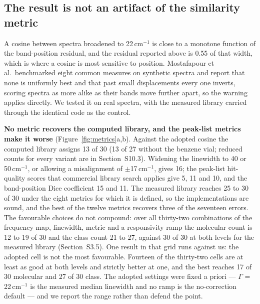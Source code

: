 \documentclass[review,12pt]{elsarticle}
\newcommand*\wn{\ensuremath{\text{cm}^{-1}}}
\begin{document}
\subsection{The result is not an artifact of the similarity metric}

A cosine between spectra broadened to 22\,\wn{} is close to a monotone function of the
band-position residual, and the residual reported above is 0.55 of that width, which is
where a cosine is most sensitive to position. Mostafapour et al.\ benchmarked eight common
measures on synthetic spectra and report that none is uniformly best and that past small
displacements every one inverts, scoring spectra as more alike as their bands move further
apart,\cite{mostafapour2026raman} so the warning applies directly. We tested it on real
spectra, with the measured library carried through the identical code as the control.

\textbf{No metric recovers the computed library, and the peak-list metrics make it worse}
(Figure~\ref{fig:metrics}a,b). Against the adopted cosine the computed library assigns 13
of 30 (13 of 27 without the benzene vial; reduced counts for every variant are in
Section~S10.3). Widening the linewidth to 40 or 50\,\wn{}, or allowing a misalignment of
$\pm$17\,\wn{}, gives 16; the peak-list hit-quality scores that commercial library search
applies give 5, 11 and 10, and the band-position Dice coefficient 15 and 11. The measured
library reaches 25 to 30 of 30 under the eight metrics for which it is defined, so the
implementations are sound, and the best of the twelve metrics recovers three of the
seventeen errors. The favourable choices do not compound: over all thirty-two combinations
of the frequency map, linewidth, metric and a responsivity ramp the molecular count is 12
to 19 of 30 and the class count 21 to 27, against 30 of 30 at both levels for the measured
library (Section~S3.5). One result in that grid runs against us: the adopted cell is not
the most favourable. Fourteen of the thirty-two cells are at least as good at both levels
and strictly better at one, and the best reaches 17 of 30 molecular and 27 of 30 class. The
adopted settings were fixed a priori --- $\Gamma$ = 22\,\wn{} is the measured median
linewidth and no ramp is the no-correction default --- and we report the range rather than
defend the point.
\end{document}
